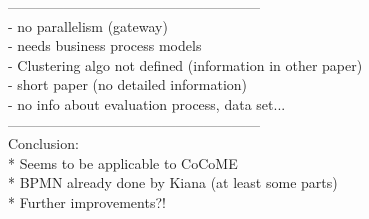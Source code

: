 ------------------------------------------------------\\
- no parallelism (gateway) \\
- needs business process models\\
- Clustering algo not defined (information in other paper)\\
- short paper (no detailed information)\\
- no info about evaluation process, data set...\\




------------------------------------------------------\\
Conclusion: \\
* Seems to be applicable to CoCoME\\
* BPMN already done by Kiana (at least some parts)\\
* Further improvements?!\\










